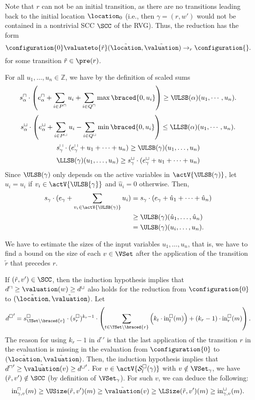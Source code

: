 Note that $r$ can not be an initial transition, as there are no transitions leading back to the initial location $\location_0$
(i.e., then $\gamma = (r, w')$ would not be contained in a nontrivial SCC $\SCC$ of the RVG).
Thus, the reduction has the form
\[ \configuration{0} \valuateto{\tilde{r}} (\tilde{\location}, \tilde{\valuation}) \rightarrow_r \configuration{}. \]
for some transition $\tilde{r} \in \pre(r)$.

For all $u_1, \dots, u_n \in \mathbb{Z}$, we have by the definition of scaled sums
  \[ s^\sqcap_\alpha \cdot \left( e^\sqcap_\alpha + \sum_{i \in P^\sqcap} u_i + \sum_{i \in Q^\sqcap} \max \braced{0,u_i} \right) \geq \ULSB(\alpha)(u_1, \cdots, u_n). \]
  \[ s^\sqcup_\alpha \cdot \left( e^\sqcup_\alpha + \sum_{i \in P^\sqcup} u_i - \sum_{i \in Q^\sqcup} \min \braced{0,u_i} \right) \leq \LLSB(\alpha)(u_1, \cdots, u_n). \]
\[ s^\sqcap_\gamma \cdot (e^\sqcap_\gamma + u_1 + \dots + u_n) \geq \ULSB(\gamma)(u_1, \dots, u_n) \]
\[ \LLSB(\gamma)(u_1, \dots, u_n) \geq s^\sqcup_\gamma \cdot (e^\sqcup_\gamma + u_1 + \dots + u_n) \]
Since $\ULSB(\gamma)$ only depends on the active variables in $\actV{\ULSB(\gamma)}$, let $\hat{u}_i = u_i$ if $v_i \in \actV{\ULSB{\gamma}}$ and $\hat{u}_i = 0$ otherwise.
Then,
\begin{align*}
  s_\gamma \cdot (e_\gamma + \sum_{v_i \in \actV{\ULSB(\gamma)}} u_i) &= s_\gamma \cdot (e_\gamma + \hat{u}_1 + \dots + \hat{u}_n) \\
  & \geq \ULSB(\gamma)(\hat{u}_1, \dots, \hat{u}_n) \\
  &= \ULSB(\gamma)(u_i, \dots, u_n).
\end{align*}

We have to estimate the sizes of the input variables $u_1, \dots, u_n$,
that is, we have to find a bound on the size of each $v \in \VSet$ after the application of the transition $\tilde{r}$ that precedes $r$.

If $(\tilde{r}, v') \in \SCC$, then the induction hypothesis implies that $d^\sqcap \geq \valuation(w) \geq d^\sqcup$ also holds for the reduction from $\configuration{0}$ to $(\tilde{\location}, \tilde{\valuation})$.
Let
\[ {d^\square}' = s^\square_{\TSet \setminus \braced{r}} \cdot (s^\square_r)^{k_r - 1} \cdot \left( \sum_{t \in \TSet \setminus \braced{r}} \left( k_t \cdot \text{in}^\square_t(m) \right) + \left( k_r - 1 \right) \cdot \text{in}^\square_r(m) \right). \]
The reason for using $k_r - 1$ in ${d^\square}'$ is that the last application of the transition $r$ in the evaluation is missing in the evaluation from $\configuration{0}$ to $(\tilde{\location}, \tilde{\valuation})$.
Then, the induction hypothesis implies that ${d^\sqcap}' \geq \tilde{\valuation}(v) \geq {d^\sqcup}'$.
For $v \in \actV{\mathcal{S}^\square_l(\gamma)}$ with $v \notin \VSet_\gamma$, we have $(\tilde{r}, v') \notin \SCC$ (by definition of $\VSet_\gamma$).
For such $v$, we can deduce the following:
\[ \text{in}^\sqcap_{\gamma,{v}}(m) \geq \USize(\tilde{r}, v')(m) \geq \tilde{\valuation}(v) \geq \LSize(\tilde{r}, v')(m) \geq \text{in}^\sqcup_{\gamma,{v}}(m). \]

